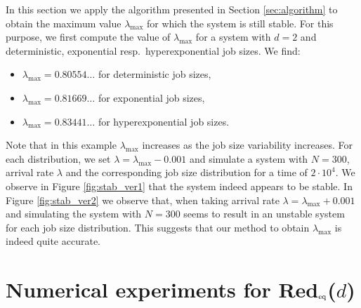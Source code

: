 \documentclass[12pt]{report}
\newcommand{\Redid}{Red$_{\textup{eq}}$($d$)}
\begin{document}
In this section we apply the algorithm presented in Section \ref{sec:algorithm} to obtain the maximum value $\lambda_{\max}$ for which the system is still stable. For this purpose, we first compute the value of $\lambda_{\max}$ for a system with $d=2$ and deterministic, exponential resp.~hyperexponential job sizes. We find:
\begin{itemize}
\item $\lambda_{\max} = 0.80554\dots$ for deterministic job sizes,
\item $\lambda_{\max} = 0.81669\dots$ for exponential job sizes,
\item $\lambda_{\max} = 0.83441\dots$ for hyperexponential job sizes.
\end{itemize}
Note that in this example $\lambda_{\max}$ increases as the job size variability increases.
For each distribution, we set $\lambda=\lambda_{\max}-0.001$ and simulate a system with $N=300$, arrival rate $\lambda$ and the corresponding job size distribution for a time of $2\cdot 10^4$. We observe in Figure \ref{fig:stab_ver1} that the system  indeed appears to be stable. In Figure \ref{fig:stab_ver2} we observe that, when taking arrival rate $\lambda=\lambda_{\max}+0.001$ and simulating the system with $N=300$ seems to result in an unstable system for each job size distribution. This suggests that our method to obtain $\lambda_{\max}$ is indeed quite accurate.

\section{Numerical experiments for \Redid}\label{sec:numerical}
\end{document}
